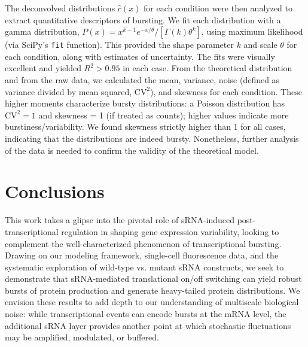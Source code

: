 The deconvolved distributions $\hat{c}(x)$ for each condition were then analyzed to extract quantitative descriptors of bursting. We fit each distribution with a gamma distribution, $P(x) = x^{k-1}e^{-x/\theta}/[\Gamma(k)\theta^k]$, using maximum likelihood (via SciPy's \texttt{fit} function). This provided the shape parameter $k$ and scale $\theta$ for each condition, along with estimates of uncertainty. The fits were visually excellent and yielded $R^2>0.95$ in each case. From the theoretical distribution and from the raw data, we calculated the mean, variance, noise (defined as variance divided by mean squared, $\mathrm{CV}^2$), and skewness for each condition. These higher moments characterize bursty distributions: a Poisson distribution has $\mathrm{CV}^2=1$ and skewness = 1 (if treated as counts); higher values indicate more burstiness/variability. We found skewness strictly higher than 1 for all cases, indicating that the distributions are indeed bursty. Nonetheless, further analysis of the data is needed to confirm the validity of the theoretical model.

\vfill
\section*{Conclusions}
This work takes a glipse into the pivotal role of sRNA-induced post-transcriptional regulation in shaping gene expression variability, looking to complement the well-characterized phenomenon of transcriptional bursting. Drawing on our modeling framework, single-cell fluorescence data, and the systematic exploration of wild-type vs. mutant sRNA constructs, we seek to demonstrate that sRNA-mediated translational on/off switching can yield robust bursts of protein production and generate heavy-tailed protein distributions. We envision these results to add depth to our understanding of multiscale biological noise: while transcriptional events can encode bursts at the mRNA level, the additional sRNA layer provides another point at which stochastic fluctuations may be amplified, modulated, or buffered. 

